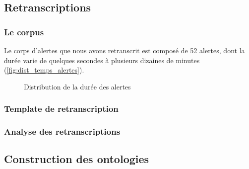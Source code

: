 
\subsection{Retranscriptions}

\subsubsection{Le corpus}

Le corps d'alertes que nous avons retranscrit est composé de 52
alertes, dont la durée varie de quelques secondes à plusieurs dizaines
de minutes (\autoref{fig:dist_temps_alertes}).

\begin{figure}
  \centering
  
  \caption{Distribution de la durée des alertes}
  \label{fig:dist_temps_alertes}
\end{figure}

\subsubsection{Template de retranscription}

\subsubsection{Analyse des retranscriptions}

\subsection{Construction des ontologies}

